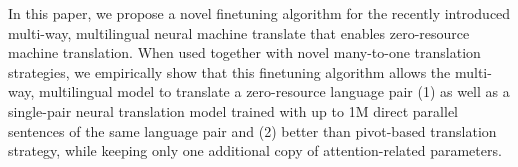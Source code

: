 In this paper, we propose a novel finetuning algorithm for the recently introduced multi-way, multilingual neural machine translate that enables zero-resource machine translation. When used together with novel many-to-one translation strategies, we empirically show that this finetuning algorithm allows the multi-way, multilingual model to translate a zero-resource language pair (1) as well as a single-pair neural translation model trained with up to 1M direct parallel sentences of the same language pair and (2) better than pivot-based translation strategy, while keeping only one additional copy of attention-related parameters.
